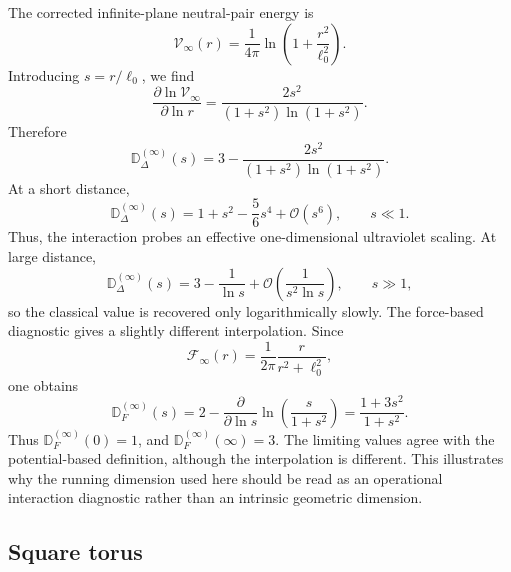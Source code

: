 \documentclass[openacc]{rsproca_new}%
\begin{document}
The corrected infinite-plane neutral-pair energy is
\begin{equation}
  \mathcal V_\infty(r)=\frac{1}{4\pi}\ln\left(1+\frac{r^2}{\ell_0^2}\right).
\end{equation}
Introducing $s=r/\ell_0$, we find
\begin{equation}
  \frac{\partial\ln \mathcal V_\infty}{\partial\ln r}=\frac{2s^2}{(1+s^2)\ln(1+s^2)}.
\end{equation}
Therefore
\begin{equation}\label{Dinf}
  \mathbb D_\Delta^{(\infty)}(s)=3-\frac{2s^2}{(1+s^2)\ln(1+s^2)}.
\end{equation}
At a short distance,
\begin{equation}
  \mathbb D_\Delta^{(\infty)}(s)=1+s^2-\frac{5}{6}s^4+\mathcal{O}(s^6),\qquad s\ll 1.
\end{equation}
Thus, the interaction probes an effective one-dimensional ultraviolet scaling. At large distance,
\begin{equation}
  \mathbb D_\Delta^{(\infty)}(s)=3-\frac{1}{\ln s}+\mathcal{O}\!\left(\frac{1}{s^2\ln s}\right),\qquad s\gg 1,
\end{equation}
so the classical value is recovered only logarithmically slowly. The force-based diagnostic gives a slightly different interpolation. Since
\begin{equation}
\mathcal F_\infty(r)=\frac{1}{2\pi}\frac{r}{r^2+\ell_0^2},
\end{equation}
one obtains
\begin{equation}
\mathbb D_F^{(\infty)}(s)=2-\frac{\partial}{\partial\ln s}\ln\left(\frac{s}{1+s^2}\right)
=\frac{1+3s^2}{1+s^2}.
\end{equation}
Thus $\mathbb D_F^{(\infty)}(0)=1$, and $\mathbb D_F^{(\infty)}(\infty)=3$. The limiting values agree with the potential-based definition, although the interpolation is different. This illustrates why the running dimension used here should be read as an operational interaction diagnostic rather than an intrinsic geometric dimension.

\subsection{Square torus}
\label{subsec:running_dimension_torus}
\end{document}
